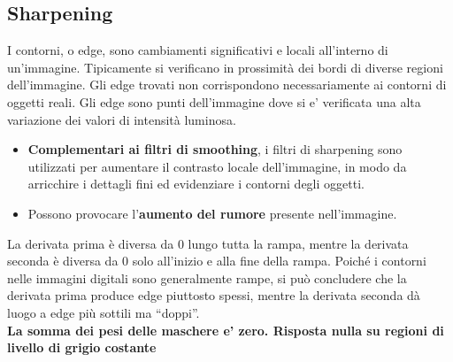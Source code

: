 \documentclass[12pt]{article}
\begin{document}
\subsection{Sharpening}
I contorni, o edge, sono cambiamenti significativi e locali all’interno di un’immagine. Tipicamente si verificano in prossimità dei bordi di diverse regioni dell’immagine. Gli edge trovati non corrispondono necessariamente ai contorni di oggetti reali. Gli edge sono punti dell’immagine dove si e’ verificata una alta variazione dei valori di intensità luminosa.
\begin{itemize}
    \item \textbf{Complementari ai filtri di smoothing}, i filtri di sharpening sono utilizzati per aumentare il contrasto locale dell’immagine, in modo da arricchire i dettagli fini ed evidenziare i contorni degli oggetti.
    \item Possono provocare l’\textbf{aumento del rumore} presente nell’immagine.
\end{itemize}
La derivata prima è diversa da 0 lungo tutta la rampa, mentre la derivata seconda è diversa da 0 solo all’inizio e alla fine della rampa. Poiché i contorni nelle immagini digitali sono generalmente rampe, si può concludere che la derivata prima produce edge piuttosto spessi, mentre la derivata seconda dà luogo a edge più sottili ma “doppi”.\\
\textbf{La somma dei pesi delle maschere e’ zero. Risposta nulla su regioni di livello di grigio costante}
\end{document}
